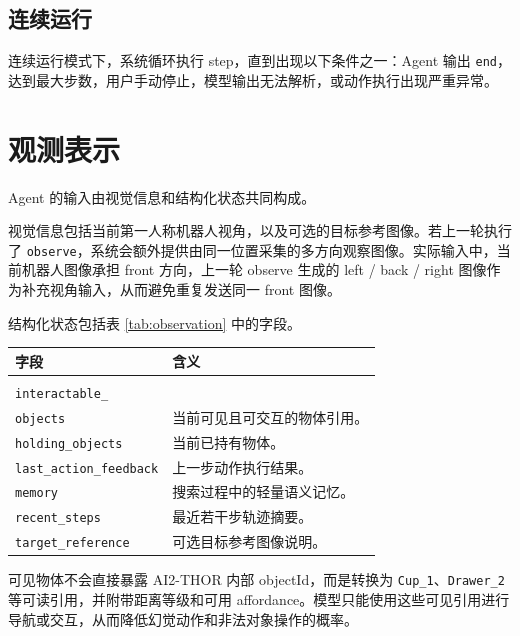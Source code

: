 \documentclass[UTF8,a4paper,12pt]{ctexart}
\begin{document}
\subsection{连续运行}

连续运行模式下，系统循环执行 step，直到出现以下条件之一：Agent 输出 \texttt{end}，达到最大步数，用户手动停止，模型输出无法解析，或动作执行出现严重异常。

\section{观测表示}

Agent 的输入由视觉信息和结构化状态共同构成。

视觉信息包括当前第一人称机器人视角，以及可选的目标参考图像。若上一轮执行了 \texttt{observe}，系统会额外提供由同一位置采集的多方向观察图像。实际输入中，当前机器人图像承担 front 方向，上一轮 observe 生成的 left / back / right 图像作为补充视角输入，从而避免重复发送同一 front 图像。

结构化状态包括表 \ref{tab:observation} 中的字段。

\begin{center}
\begin{minipage}{0.95\textwidth}
\label{tab:observation}
\begin{tabularx}{\textwidth}{p{4.2cm}X}
\toprule
字段 & 含义 \\
\midrule
\makecell[l]{\texttt{visible\_}\\\texttt{interactable\_}\\\texttt{objects}} & 当前可见且可交互的物体引用。 \\
\texttt{holding\_objects} & 当前已持有物体。 \\
\texttt{last\_action\_feedback} & 上一步动作执行结果。 \\
\texttt{memory} & 搜索过程中的轻量语义记忆。 \\
\texttt{recent\_steps} & 最近若干步轨迹摘要。 \\
\texttt{target\_reference} & 可选目标参考图像说明。 \\
\bottomrule
\end{tabularx}
\end{minipage}
\end{center}

可见物体不会直接暴露 AI2-THOR 内部 objectId，而是转换为 \texttt{Cup\_1}、\texttt{Drawer\_2} 等可读引用，并附带距离等级和可用 affordance。模型只能使用这些可见引用进行导航或交互，从而降低幻觉动作和非法对象操作的概率。
\end{document}
